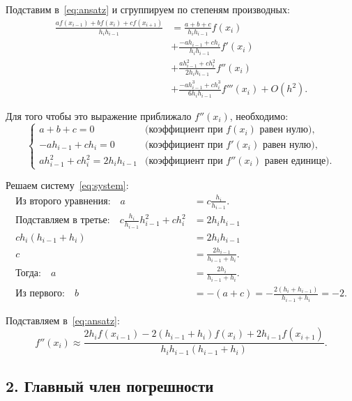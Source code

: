 \documentclass{article}
\begin{document}
Подставим в~\eqref{eq:ansatz} и сгруппируем по степеням производных:
\begin{align}
\frac{a f(x_{i-1}) + b f(x_i) + c f(x_{i+1})}{h_i h_{i-1}} &= \frac{a + b + c}{h_i h_{i-1}} f(x_i) \nonumber \\
&+ \frac{-a h_{i-1} + c h_i}{h_i h_{i-1}} f'(x_i) \nonumber \\
&+ \frac{a h_{i-1}^2 + c h_i^2}{2 h_i h_{i-1}} f''(x_i) \nonumber \\
&+ \frac{-a h_{i-1}^3 + c h_i^3}{6 h_i h_{i-1}} f'''(x_i) + O(h^2).
\end{align}

Для того чтобы это выражение приближало $f''(x_i)$, необходимо:
\begin{equation}
\begin{cases}
a + b + c = 0 & \text{(коэффициент при } f(x_i) \text{ равен нулю)}, \\
-a h_{i-1} + c h_i = 0 & \text{(коэффициент при } f'(x_i) \text{ равен нулю)}, \\
a h_{i-1}^2 + c h_i^2 = 2 h_i h_{i-1} & \text{(коэффициент при } f''(x_i) \text{ равен единице)}.
\end{cases}
\label{eq:system}
\end{equation}

Решаем систему~\eqref{eq:system}:
\begin{align}
\text{Из второго уравнения:} \quad a &= c \frac{h_i}{h_{i-1}}. \\
\text{Подставляем в третье:} \quad c \frac{h_i}{h_{i-1}} h_{i-1}^2 + c h_i^2 &= 2 h_i h_{i-1} \nonumber \\
c h_i (h_{i-1} + h_i) &= 2 h_i h_{i-1} \nonumber \\
c &= \frac{2 h_{i-1}}{h_{i-1} + h_i}. \\
\text{Тогда:} \quad a &= \frac{2 h_i}{h_{i-1} + h_i}. \\
\text{Из первого:} \quad b &= -(a + c) = -\frac{2(h_i + h_{i-1})}{h_{i-1} + h_i} = -2.
\end{align}

Подставляем в~\eqref{eq:ansatz}:
\begin{equation}
\boxed{f''(x_i) \approx \frac{2 h_i f(x_{i-1}) - 2(h_{i-1} + h_i) f(x_i) + 2 h_{i-1} f(x_{i+1})}{h_i h_{i-1} (h_{i-1} + h_i)}.}
\label{eq:second_deriv}
\end{equation}

\subsection*{2. Главный член погрешности}
\end{document}
